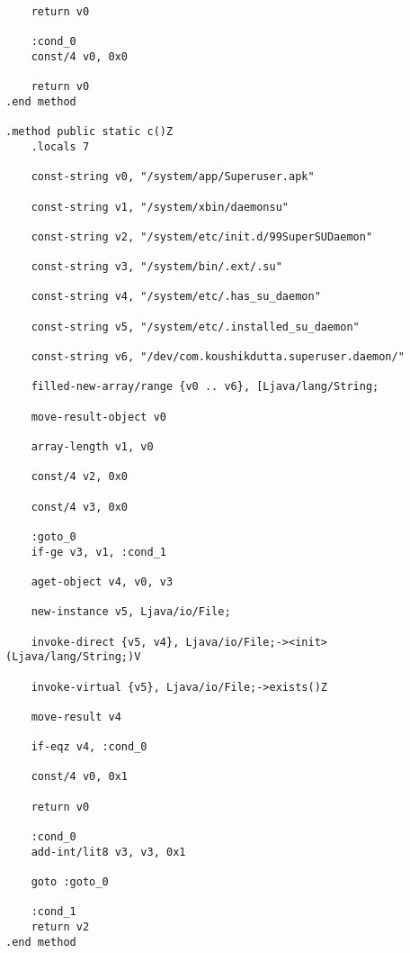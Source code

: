 \begin{verbatim}
    return v0

    :cond_0
    const/4 v0, 0x0

    return v0
.end method

.method public static c()Z
    .locals 7

    const-string v0, "/system/app/Superuser.apk"

    const-string v1, "/system/xbin/daemonsu"

    const-string v2, "/system/etc/init.d/99SuperSUDaemon"

    const-string v3, "/system/bin/.ext/.su"

    const-string v4, "/system/etc/.has_su_daemon"

    const-string v5, "/system/etc/.installed_su_daemon"

    const-string v6, "/dev/com.koushikdutta.superuser.daemon/"

    filled-new-array/range {v0 .. v6}, [Ljava/lang/String;

    move-result-object v0

    array-length v1, v0

    const/4 v2, 0x0

    const/4 v3, 0x0

    :goto_0
    if-ge v3, v1, :cond_1

    aget-object v4, v0, v3

    new-instance v5, Ljava/io/File;

    invoke-direct {v5, v4}, Ljava/io/File;-><init>(Ljava/lang/String;)V

    invoke-virtual {v5}, Ljava/io/File;->exists()Z

    move-result v4

    if-eqz v4, :cond_0

    const/4 v0, 0x1

    return v0

    :cond_0
    add-int/lit8 v3, v3, 0x1

    goto :goto_0

    :cond_1
    return v2
.end method
\end{verbatim}
